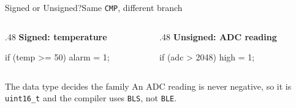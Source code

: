 \documentclass[9pt,aspectratio=169,xcolor=table]{beamer}
\begin{document}
{\beamerextras
\begin{frame}[fragile]{Signed or Unsigned?}{Same \texttt{CMP}, different branch}
    \begin{columns}[T]
    \begin{column}{.48\textwidth}
        \textbf{Signed: temperature}
        \begin{cc}[basicstyle=\footnotesize\ttfamily]
if (temp >= 50) {
    alarm = 1;
}
\end{cc}
    \end{column}
    \begin{column}{.48\textwidth}
        \textbf{Unsigned: ADC reading}
        \begin{cc}[basicstyle=\footnotesize\ttfamily]
if (adc > 2048) {
    high = 1;
}
\end{cc}
    \end{column}
    \end{columns}

    \vspace{2mm}
    \begin{block}{The data type decides the family}
        An ADC reading is never negative, so it is \texttt{uint16\_t}
        and the compiler uses \alert{\texttt{BLS}}, not \texttt{BLE}.
    \end{block}
\end{frame}
}
\end{document}
